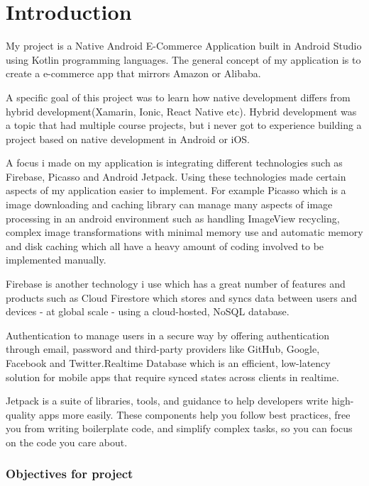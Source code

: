 \chapter{Introduction}
My project is a Native Android E-Commerce Application built in Android Studio using Kotlin programming languages. The general concept of my application is to create a e-commerce app that mirrors Amazon or Alibaba.

A specific goal of this project was to learn how native development differs from hybrid development(Xamarin, Ionic, React Native etc). Hybrid development was a topic that had multiple course projects, but i never got to experience building a project based on native development in Android or iOS.
\newline 

A focus i made on my application is integrating different technologies such as Firebase, Picasso and Android Jetpack. Using these technologies made certain aspects of my application easier to implement. For example Picasso which is a image downloading and caching library can manage many aspects of image processing in an android environment such as handling ImageView recycling, complex image transformations with minimal memory use and automatic memory and disk caching which all have a heavy amount of coding involved to be implemented manually. \newline

Firebase is another technology i use which has a great number of features and products such as Cloud Firestore which stores and syncs data between users and devices - at global scale - using a cloud-hosted, NoSQL database.\

Authentication to manage users in a secure way by offering authentication through email, password and third-party providers like GitHub, Google, Facebook and Twitter.Realtime Database which is an efficient, low-latency solution for mobile apps that require synced states across clients in realtime.\newline

Jetpack is a suite of libraries, tools, and guidance to help developers write high-quality apps more easily. These components help you follow best practices, free you from writing boilerplate code, and simplify complex tasks, so you can focus on the code you care about.
\newline 



\newpage
\subsection{Objectives for project}

